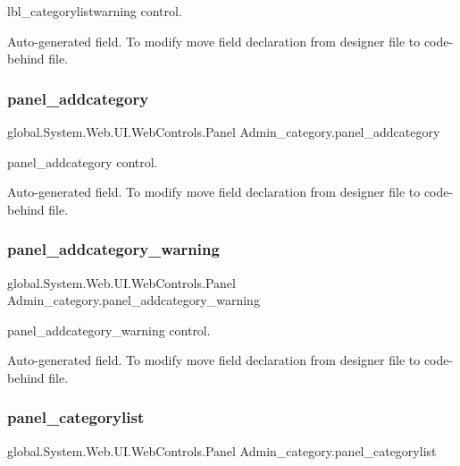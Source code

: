 lbl\+\_\+categorylistwarning control. 

Auto-\/generated field. To modify move field declaration from designer file to code-\/behind file. \mbox{\label{class_admin__category_a372cd5bc07356b2a44a95822f1711811}} 
\subsubsection{\texorpdfstring{panel\_addcategory}{panel\_addcategory}}
{\footnotesize\ttfamily global.\+System.\+Web.\+U\+I.\+Web\+Controls.\+Panel Admin\+\_\+category.\+panel\+\_\+addcategory\hspace{0.3cm}{\ttfamily [protected]}}



panel\+\_\+addcategory control. 

Auto-\/generated field. To modify move field declaration from designer file to code-\/behind file. \mbox{\label{class_admin__category_a6959b0db57122c66b2dfe31f83fb7ae2}} 
\subsubsection{\texorpdfstring{panel\_addcategory\_warning}{panel\_addcategory\_warning}}
{\footnotesize\ttfamily global.\+System.\+Web.\+U\+I.\+Web\+Controls.\+Panel Admin\+\_\+category.\+panel\+\_\+addcategory\+\_\+warning\hspace{0.3cm}{\ttfamily [protected]}}



panel\+\_\+addcategory\+\_\+warning control. 

Auto-\/generated field. To modify move field declaration from designer file to code-\/behind file. \mbox{\label{class_admin__category_aa87242d0956054d6c61c7abe15add49c}} 
\subsubsection{\texorpdfstring{panel\_categorylist}{panel\_categorylist}}
{\footnotesize\ttfamily global.\+System.\+Web.\+U\+I.\+Web\+Controls.\+Panel Admin\+\_\+category.\+panel\+\_\+categorylist\hspace{0.3cm}{\ttfamily [protected]}}



